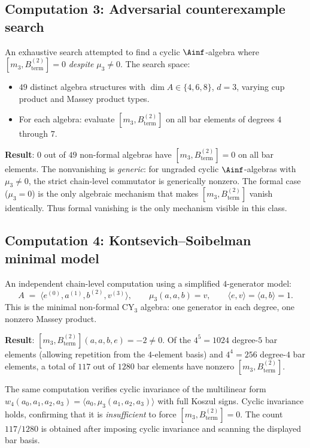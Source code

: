 \subsection{Computation 3: Adversarial counterexample search}
\label{subsec:comp-counterexample}

\begin{computation}[{Counterexample search for \texorpdfstring{$[m_3, B^{(2)}_{\mathrm{term}}] = 0$}{[m-3, B-term-(2)] = 0}}]
\label{comp:counterexample}
An exhaustive search attempted to find a cyclic $\Ainf$-algebra where
$[m_3, B^{(2)}_{\mathrm{term}}] = 0$
\emph{despite} $\mu_3 \neq 0$. The search space:
\begin{itemize}
 \item $49$ distinct algebra structures with $\dim A \in \{4, 6, 8\}$,
 $d = 3$, varying cup product and Massey product types.
 \item For each algebra: evaluate $[m_3, B^{(2)}_{\mathrm{term}}]$ on all bar
 elements of degrees $4$ through $7$.
\end{itemize}

\textbf{Result}: $0$ out of $49$ non-formal algebras have
$[m_3, B^{(2)}_{\mathrm{term}}] = 0$ on all bar elements. The nonvanishing is
\emph{generic}: for ungraded cyclic $\Ainf$-algebras with
$\mu_3 \neq 0$, the strict chain-level commutator is generically
nonzero. The formal case ($\mu_3 = 0$) is the only
algebraic mechanism that makes $[m_3, B^{(2)}_{\mathrm{term}}]$ vanish
identically.
Thus formal vanishing is the only mechanism visible in this class.
\end{computation}


\subsection{Computation 4: Kontsevich--Soibelman minimal model}
\label{subsec:comp-ks}

\begin{computation}
\label{comp:ks-minimal}
An independent chain-level computation using a simplified
$4$-generator model:
\[
 A \;=\; \langle e^{(0)}, a^{(1)}, b^{(2)}, v^{(3)} \rangle,
 \qquad \mu_3(a, a, b) = v, \qquad
 \langle e, v \rangle = \langle a, b \rangle = 1.
\]
This is the minimal non-formal CY$_3$ algebra: one generator
in each degree, one nonzero Massey product.

\textbf{Result}: $[m_3, B^{(2)}_{\mathrm{term}}](a, a, b, e) = -2 \neq 0$.
Of the $4^5 = 1024$ degree-$5$ bar elements (allowing
repetition from the $4$-element basis) and $4^4 = 256$
degree-$4$ bar elements, a total of $117$ out of $1280$ bar
elements have nonzero $[m_3, B^{(2)}_{\mathrm{term}}]$.

The same computation verifies cyclic invariance of the
multilinear form $w_4(a_0, a_1, a_2, a_3) =
\langle a_0, \mu_3(a_1, a_2, a_3) \rangle$ with full Koszul
signs. Cyclic invariance holds, confirming that it is
\emph{insufficient} to force $[m_3, B^{(2)}_{\mathrm{term}}] = 0$.
The count $117/1280$ is obtained after imposing cyclic invariance and
scanning the displayed bar basis.
\end{computation}


